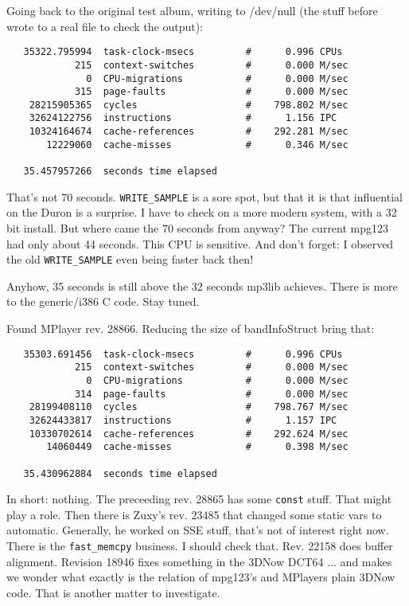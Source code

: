 \documentclass[a4paper,12pt]{scrartcl}
\begin{document}
Going back to the original test album, writing to /dev/null (the stuff before wrote to a real file to check the output):
\begin{verbatim}
   35322.795994  task-clock-msecs         #      0.996 CPUs 
            215  context-switches         #      0.000 M/sec
              0  CPU-migrations           #      0.000 M/sec
            315  page-faults              #      0.000 M/sec
    28215905365  cycles                   #    798.802 M/sec
    32624122756  instructions             #      1.156 IPC  
    10324164674  cache-references         #    292.281 M/sec
       12229060  cache-misses             #      0.346 M/sec

   35.457957266  seconds time elapsed
\end{verbatim}
That's not 70 seconds. \verb:WRITE_SAMPLE: is a sore spot, but that it is that influential on the Duron is a surprise. I have to check on a more modern system, with a 32 bit install.
But where came the 70 seconds from anyway? The current mpg123 had only about 44 seconds. This CPU is sensitive. And don't forget: I observed the old \verb:WRITE_SAMPLE: even being faster back then!

Anyhow, 35 seconds is still above the 32 seconds mp3lib achieves. There is more to the generic/i386 C code. Stay tuned.

Found MPlayer rev. 28866. Reducing the size of bandInfoStruct bring that:
\begin{verbatim}
   35303.691456  task-clock-msecs         #      0.996 CPUs 
            215  context-switches         #      0.000 M/sec
              0  CPU-migrations           #      0.000 M/sec
            314  page-faults              #      0.000 M/sec
    28199408110  cycles                   #    798.767 M/sec
    32624433817  instructions             #      1.157 IPC  
    10330702614  cache-references         #    292.624 M/sec
       14060449  cache-misses             #      0.398 M/sec

   35.430962884  seconds time elapsed
\end{verbatim}
In short: nothing. The preceeding rev. 28865 has some \verb:const: stuff. That might play a role. Then there is Zuxy's rev. 23485 that changed some static vars to automatic. Generally, he worked on SSE stuff, that's not of interest right now.
There is the \verb:fast_memcpy: business. I should check that. Rev. 22158 does buffer alignment.
Revision 18946 fixes something in the 3DNow DCT64 ... and makes we wonder what exactly is the relation of mpg123's and MPlayers plain 3DNow code. That is another matter to investigate.
\end{document}
